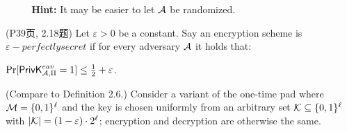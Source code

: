 \begin{questions}
        \par $\text{ }\text{ }\text{ }\text{ }$\textbf{Hint:} It may be easier to let $\mathcal{A}$ be randomized.

        \begin{solution}
        \end{solution}

    \question (P39页, 2.18题) Let $\varepsilon > 0$ be a constant. Say an encryption scheme is $\varepsilon -perfectly secret$ if for every adversary $\mathcal{A}$ it holds that:

    \begin{center} $\Pr[\mathsf{PrivK}^{eav}_{\mathcal{A},\Pi}=1] \le \frac{1}{2} + \varepsilon $. \end{center}

    (Compare to Definition 2.6.) Consider a variant of the one-time pad where $\mathcal{M}=\{0,1\}^{\ell}$ and the key is chosen uniformly from an arbitrary set $\mathcal{K} \subseteq \{0,1\}^{\ell}$ with $|\mathcal{K}|=(1-\varepsilon ) \cdot 2^{\ell}$; encryption and decryption are otherwise the same.

\end{questions}
